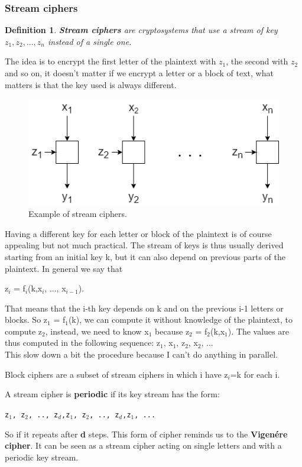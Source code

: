 \documentclass[a4paper, 12pt]{report}
\newtheorem{definition}{\textbf{Definition}}
\begin{document}
\subsubsection{Stream ciphers}
\begin{definition}
	\textbf{Stream ciphers} are cryptosystems that use a stream of key $z_1, z_2, ..., z_n$ instead of a single one.
\end{definition}
The idea is to encrypt the first letter of the plaintext with $z_1$, the second with $z_2$ and so on, it doesn't matter if we encrypt a letter or a block of text, what matters is that the key used is always different.
\begin{figure}[H]
	\centering
	\includegraphics[scale=0.6]{images/Lec4/streamciphers.png}
	\caption{Example of stream ciphers.}
	\label{fig:streamciphers}
\end{figure}

Having a different key for each letter or block of the plaintext is of course appealing but not much practical. The stream of keys is thus usually derived starting from an initial key k, but it can also depend on previous parts of the plaintext. In general we say that
\begin{center}
	z$_i$ = f$_i$(k,x$_i$, ..., x$_{i-1}$).
\end{center}
That means that the i-th key depends on k and on the previous i-1 letters or blocks. So z$_1$ = f$_1$(k), we can compute it without knowledge of the plaintext, to compute z$_2$, instead, we need to know x$_1$ because z$_2$ = f$_2$(k,x$_1$). The values are thus computed in the following sequence: z$_1$, x$_1$, z$_2$, x$_2$, ...\\
This slow down a bit the procedure because I can't do anything in parallel.

Block ciphers are a subset of stream ciphers in which i have z$_i$=k for each i. 

A stream cipher is \textbf{periodic} if its key stream has the form:
\begin{center}
	\texttt{z$_1$, z$_2$, .., z$_d$,z$_1$, z$_2$, .., z$_d$,z$_1$, ...}
\end{center}
So if it repeats after \textbf{d} steps. This form of cipher reminds us to the \textbf{Vigenére cipher}. It can be seen as a stream cipher acting on single letters and with a periodic key stream.
\end{document}
